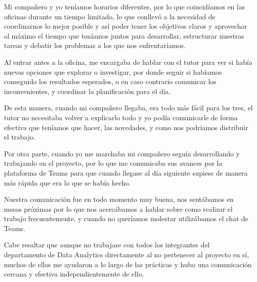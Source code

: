 Mi compañero y yo teníamos horarios diferentes, por lo que coincidíamos en las oficinas durante un tiempo limitado, lo que conllevó a la necesidad de coordinarnos lo mejor posible y así poder tener los objetivos claros y aprovechar al máximo el tiempo que teníamos juntos para desarrollar, estructurar nuestras tareas y debatir los problemas a los que nos enfrentaríamos. 

Al entrar antes a la oficina, me encargaba de hablar con el tutor para ver si había nuevas opciones que explorar o investigar, por donde seguir si habíamos conseguido los resultados esperados, o en caso contrario comunicar los inconvenientes, y coordinar la planificación para el día. 

De esta manera, cuando mi compañero llegaba, era todo más fácil para los tres, el tutor no necesitaba volver a explicarlo todo y yo podía comunicarle de forma efectiva que teníamos que hacer, las novedades, y como nos podríamos distribuir el trabajo. 

Por otra parte, cuando yo me marchaba mi compañero seguía desarrollando y trabajando en el proyecto, por lo que me comunicaba sus avances por la plataforma de Teams para que cuando llegase al día siguiente supiese de manera más rápida que era lo que se había hecho.

Nuestra comunicación fue en todo momento muy buena, nos sentábamos en mesas próximas por lo que nos acercábamos a hablar sobre como realizar el trabajo frecuentemente, y cuando no queríamos molestar utilizábamos el chat de Teams.

Cabe resaltar que aunque no trabajase con todos los integrantes del departamento de Data Analytics directamente al no pertenecer al proyecto en sí, muchos de ellos me ayudaron  a lo largo de las prácticas y hubo una comunicación cercana y efectiva independientemente de ello.